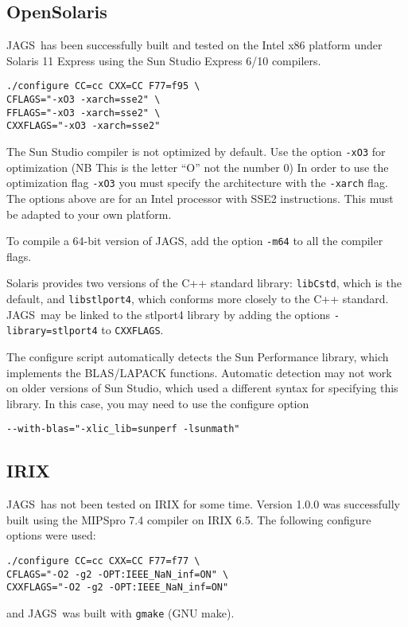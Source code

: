 \documentclass[11pt, a4paper, titlepage]{article}
\newcommand{\JAGS}{\textsf{JAGS}}
\begin{document}
\subsection{OpenSolaris}

\JAGS\ has been successfully built and tested on the Intel x86
platform under Solaris 11 Express using the Sun Studio Express 6/10
compilers.
\begin{verbatim}
./configure CC=cc CXX=CC F77=f95 \
CFLAGS="-xO3 -xarch=sse2" \
FFLAGS="-xO3 -xarch=sse2" \
CXXFLAGS="-xO3 -xarch=sse2"
\end{verbatim}
The Sun Studio compiler is not optimized by default. Use the option
\verb+-xO3+ for optimization (NB This is the letter ``O'' not the
number 0) In order to use the optimization flag \verb+-xO3+ you
must specify the architecture with the \verb+-xarch+ flag. The options
above are for an Intel processor with SSE2 instructions. This must be
adapted to your own platform.

To compile a 64-bit version of JAGS, add the option \verb+-m64+ to
all the compiler flags.

Solaris provides two versions of the C++ standard library:
\texttt{libCstd}, which is the default, and \texttt{libstlport4},
which conforms more closely to the C++ standard. \JAGS\ may be linked
to the stlport4 library by adding the options
\verb+-library=stlport4+ to \verb+CXXFLAGS+.

The configure script automatically detects the Sun Performance library,
which implements the BLAS/LAPACK functions.  Automatic detection may
not work on older versions of Sun Studio, which used a different syntax
for specifying this library.  In this case, you may need to use the
configure option
\begin{verbatim}
--with-blas="-xlic_lib=sunperf -lsunmath"
\end{verbatim}

\subsection{IRIX}

\JAGS\ has not been tested on IRIX for some time.  Version 1.0.0 was
successfully built using the MIPSpro 7.4 compiler on IRIX 6.5. The
following configure options were used:
\begin{verbatim}
./configure CC=cc CXX=CC F77=f77 \
CFLAGS="-O2 -g2 -OPT:IEEE_NaN_inf=ON" \
CXXFLAGS="-O2 -g2 -OPT:IEEE_NaN_inf=ON" 
\end{verbatim}
and \JAGS\ was built with \verb+gmake+ (GNU make).
\end{document}
